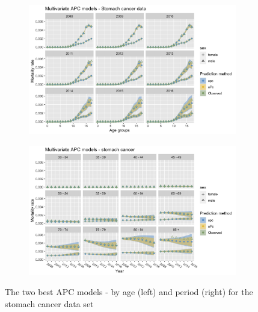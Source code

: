 \begin{figure}[h!]
    \centering
    \begin{subfigure}[b]{.45\linewidth}
        \includegraphics[width=\linewidth]{real-data/real-data-multivariate/Figures/multivariate-APC-by-age-stomach.png}
    \end{subfigure}
    \begin{subfigure}[b]{.45\linewidth}
        \includegraphics[width=\linewidth]{real-data/real-data-multivariate/Figures/multivariate-APC-by-period-stomach.png}
    \end{subfigure}
    \caption{The two best APC models - by age (left) and period (right) for the stomach cancer data set}
    \label{fig:mv-APC-stomach}
\end{figure}

